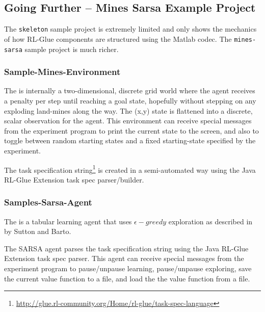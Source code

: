 \documentclass[11pt]{article}
\begin{document}
\subsection{Going Further -- Mines Sarsa Example Project}
\label{mines-sarsa-sample}
The \texttt{skeleton} sample project is extremely limited and only shows the mechanics of how RL-Glue components are structured using the Matlab codec.  The \texttt{mines-sarsa} sample project is much richer.

\subsubsection{Sample-Mines-Environment}
\label{mines-sample}
The 
is internally a two-dimensional, discrete grid world where the agent receives a penalty per step until reaching a goal state, hopefully without stepping on any exploding land-mines along the way.  The (x,y) state is flattened into a discrete, scalar observation for the agent.  This environment can receive special messages from the experiment program to print the current state to the screen, and also to toggle between random starting states and a fixed starting-state specified by the experiment.

The task specification string\footnote{\url{http://glue.rl-community.org/Home/rl-glue/task-spec-language}} is created in a semi-automated way using the Java RL-Glue Extension task spec parser/builder. 

\subsubsection{Samples-Sarsa-Agent}
\label{sarsa-sample}
The 
is a tabular learning agent that uses $\epsilon-greedy$ exploration as described in  by Sutton and Barto.

The SARSA agent parses the task specification string using the Java RL-Glue Extension task spec parser.  This agent can receive special messages from the experiment program to pause/unpause learning, pause/unpause exploring, save the current value function to a file, and load the the value function from a file.
\end{document}
